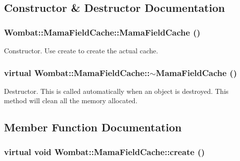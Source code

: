 \subsection{Constructor \& Destructor Documentation}
\hypertarget{classWombat_1_1MamaFieldCache_ac81de194fa915df5443340b4a4471666}{
\subsubsection[{MamaFieldCache}]{\setlength{\rightskip}{0pt plus 5cm}Wombat::MamaFieldCache::MamaFieldCache ()}}
\label{classWombat_1_1MamaFieldCache_ac81de194fa915df5443340b4a4471666}


Constructor. Use {\ttfamily create} to create the actual cache. \hypertarget{classWombat_1_1MamaFieldCache_a1e7f8a8d3ecc47d8b06583cddb1556a4}{
\subsubsection[{$\sim$MamaFieldCache}]{\setlength{\rightskip}{0pt plus 5cm}virtual Wombat::MamaFieldCache::$\sim$MamaFieldCache ()}}
\label{classWombat_1_1MamaFieldCache_a1e7f8a8d3ecc47d8b06583cddb1556a4}


Destructor. This is called automatically when an object is destroyed. This method will clean all the memory allocated. 

\subsection{Member Function Documentation}
\hypertarget{classWombat_1_1MamaFieldCache_a21392a6167a7598bcf49b5518bcfb206}{
\subsubsection[{create}]{\setlength{\rightskip}{0pt plus 5cm}virtual void Wombat::MamaFieldCache::create ()}}
\label{classWombat_1_1MamaFieldCache_a21392a6167a7598bcf49b5518bcfb206}


